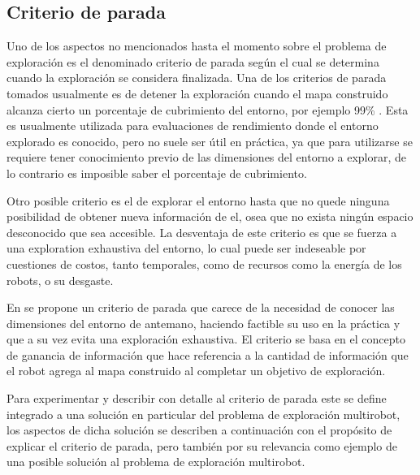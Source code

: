 
\subsection{Criterio de parada}
Uno de los aspectos no mencionados hasta el momento sobre el problema de exploración es el denominado criterio de parada según el cual se determina cuando la exploración se considera finalizada. 
Una de los criterios de parada tomados usualmente es de detener la exploración cuando el mapa construido alcanza cierto un porcentaje de cubrimiento del entorno, por ejemplo 99\% \cite{Yan2015}. Esta es usualmente utilizada para evaluaciones de rendimiento donde el entorno explorado es conocido, pero no suele ser útil en práctica, ya que para utilizarse se requiere tener conocimiento previo de las dimensiones del entorno a explorar, de lo contrario es imposible saber el porcentaje de cubrimiento.

Otro posible criterio es el de explorar el entorno hasta que no quede ninguna posibilidad de obtener nueva información de el, osea que no exista ningún espacio desconocido que sea accesible. La desventaja de este criterio es que se fuerza a una exploration exhaustiva del entorno, lo cual puede ser indeseable por cuestiones de costos, tanto temporales, como de recursos como la energía de los robots, o su desgaste.

En \cite{amorin2019novel} se propone un criterio de parada que carece de la necesidad de conocer las dimensiones del entorno de antemano, haciendo factible su uso en la práctica y que a su vez evita una exploración exhaustiva. El criterio se basa en el concepto de ganancia de información que hace referencia a la cantidad de información que el robot agrega al mapa construido al completar un objetivo de exploración. 

Para experimentar y describir con detalle al criterio de parada este se define integrado a una solución en particular del problema de exploración multirobot, los aspectos de dicha solución se describen a continuación con el propósito de explicar el criterio de parada, pero también por su relevancia como ejemplo de una posible solución al problema de exploración multirobot.

